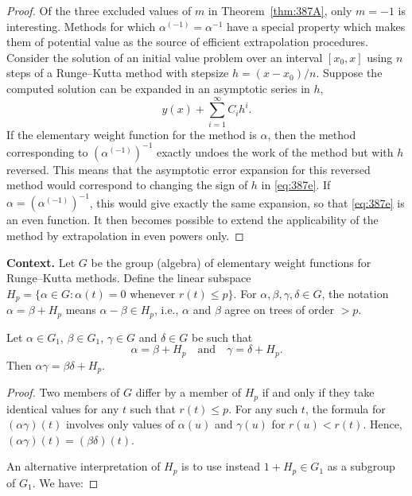 \begin{theorem}
\begin{proof}
Of the three excluded values of $m$ in Theorem~\ref{thm:387A}, only $m = -1$ is interesting. Methods for which $\alpha^{(-1)} = \alpha^{-1}$ have a special property which makes them of potential value as the source of efficient extrapolation procedures. Consider the solution of an initial value problem over an interval $[x_0, x]$ using $n$ steps of a Runge--Kutta method with stepsize $h = (x - x_0)/n$. Suppose the computed solution can be expanded in an asymptotic series in $h$,
\[
y(x) + \sum_{i=1}^\infty C_i h^i. \tag{387e}
\]
If the elementary weight function for the method is $\alpha$, then the method corresponding to $(\alpha^{(-1)})^{-1}$ exactly undoes the work of the method but with $h$ reversed. This means that the asymptotic error expansion for this reversed method would correspond to changing the sign of $h$ in \eqref{eq:387e}. If $\alpha = (\alpha^{(-1)})^{-1}$, this would give exactly the same expansion, so that \eqref{eq:387e} is an even function. It then becomes possible to extend the applicability of the method by extrapolation in even powers only.
\end{proof}

\noindent\textbf{Context.}
Let $G$ be the group (algebra) of elementary weight functions for Runge--Kutta methods.  
Define the linear subspace $H_p = \{\alpha \in G : \alpha(t) = 0 \text{ whenever } r(t) \le p\}$.  
For $\alpha, \beta, \gamma, \delta \in G$, the notation $\alpha = \beta + H_p$ means $\alpha - \beta \in H_p$, i.e., $\alpha$ and $\beta$ agree on trees of order $> p$.

\begin{theorem}

  \label{thm:388A}
Let \(\alpha \in G_1\), \(\beta \in G_1\), \(\gamma \in G\) and \(\delta \in G\) be such that
\[
\alpha = \beta + H_p \quad \text{and} \quad \gamma = \delta + H_p.
\]
Then \(\alpha\gamma = \beta\delta + H_p\).
\end{theorem}

\begin{proof}
Two members of \(G\) differ by a member of \(H_p\) if and only if they take
identical values for any \(t\) such that \(r(t) \leq p\). For any such \(t\), the formula
for \((\alpha\gamma)(t)\) involves only values of \(\alpha(u)\) and \(\gamma(u)\) for \(r(u) < r(t)\). Hence,
\((\alpha\gamma)(t) = (\beta\delta)(t)\).

An alternative interpretation of \(H_p\) is to use instead \(1 + H_p \in G_1\) as a
subgroup of \(G_1\). We have:
\end{proof}


\end{theorem}
